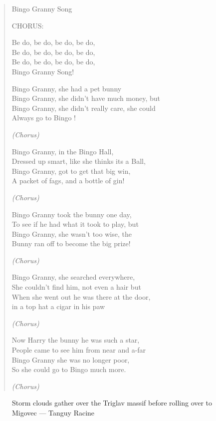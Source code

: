 \begin{verse}
\begin{centering}
Bingo Granny Song

CHORUS:

Be do, be do, be do, be do, \\
Be do, be do, be do, be do, \\
Be do, be do, be do, be do, \\
Bingo Granny Song!

Bingo    Granny,   she   had     a    pet    bunny  \\
Bingo    Granny,   she   didn't have   much    money,   but \\
Bingo    Granny,   she   didn't  really     care,       she could \\
Always go to  Bingo ! 

\emph{(Chorus)}

Bingo    Granny,     in      the Bingo      Hall, \\
Dressed up smart, like   she  thinks   its    a      Ball, \\
Bingo    Granny,    got    to    get        that  big   win, \\
A  packet of fags,  and   a     bottle of gin!


\emph{(Chorus)}

Bingo Granny took the bunny one day, \\
To see if he had what it took to play, but \\
Bingo Granny, she wasn't too wise, the \\
Bunny ran off to become the big prize!

\emph{(Chorus)}

Bingo Granny, she searched everywhere, \\
She couldn't find him, not even a hair but \\
When she went out he was there at the door, \\
in a top hat a cigar in his paw

\emph{(Chorus)}

Now Harry the bunny he was such a star, \\
People came to see him from near and a-far \\
Bingo Granny she was no longer poor, \\
So she could go to Bingo much more.

\emph{(Chorus)}
\end{centering}


\end{verse}



\begin{figure*}[b!]
\checkoddpage \ifoddpage \forcerectofloat \else \forceversofloat \fi
\centering
{}
\label{AreaNrob}
\caption{Storm clouds gather over the Triglav massif before rolling over to Migovec --- Tanguy Racine}
\end{figure*}
